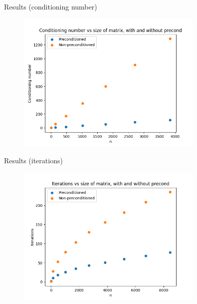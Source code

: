 \documentclass[11pt,aspectratio=1610]{beamer}
\begin{document}
\begin{frame}{Results (conditioning number)}
	\begin{figure}
		\includegraphics[width=0.8\textwidth]{../images/conditioning_test.png}
	\end{figure}

\end{frame} 




\begin{frame}{Results (iterations)}
\begin{figure}
	\includegraphics[width=0.8\textwidth]{../images/iterations_test.png}
\end{figure}
\end{frame}
\end{document}

